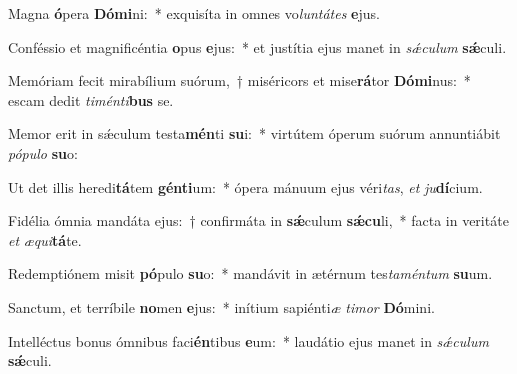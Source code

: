 \item Magna \textbf{ó}pera \textbf{Dó}\textbf{mi}ni:~* exquisíta in omnes vo\textit{lun}\textit{tá}\textit{tes} \textbf{e}jus.
\item Conféssio et magnificéntia \textbf{o}pus \textbf{e}jus:~* et justítia ejus manet in \textit{sǽ}\textit{cu}\textit{lum} \textbf{sǽ}culi.
\item Memóriam fecit mirabílium suórum,~† miséricors et mise\textbf{rá}tor \textbf{Dó}\textbf{mi}nus:~* escam dedit \textit{ti}\textit{mén}\textit{ti}\textbf{bus} se.
\item Memor erit in sǽculum testa\textbf{mén}ti \textbf{su}i:~* virtútem óperum suórum annuntiábit \textit{pó}\textit{pu}\textit{lo} \textbf{su}o:
\item Ut det illis heredi\textbf{tá}tem \textbf{gén}\textbf{ti}um:~* ópera mánuum ejus véri\textit{tas}, \textit{et} \textit{ju}\textbf{dí}cium.
\item Fidélia ómnia mandáta ejus:~† confirmáta in \textbf{sǽ}culum \textbf{sǽ}\textbf{cu}li,~* facta in veritáte \textit{et} \textit{æ}\textit{qui}\textbf{tá}te.
\item Redemptiónem misit \textbf{pó}pulo \textbf{su}o:~* mandávit in ætérnum tes\textit{ta}\textit{mén}\textit{tum} \textbf{su}um.
\item Sanctum, et terríbile \textbf{no}men \textbf{e}jus:~* inítium sapiénti\textit{æ} \textit{ti}\textit{mor} \textbf{Dó}mini.
\item Intelléctus bonus ómnibus faci\textbf{én}tibus \textbf{e}um:~* laudátio ejus manet in \textit{sǽ}\textit{cu}\textit{lum} \textbf{sǽ}culi.
